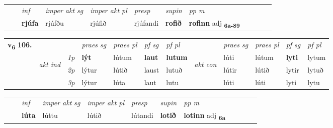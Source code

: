 \begin{tabular}{llllllllllll}
 & & \textit{inf} & \textit{imper akt sg} & \textit{imper akt pl}   & \textit{presp} & \textit{supin}  & \textit{pp m}     \\*
  & & \textbf{rjúfa} & rjúfðu  & rjúfið   & rjúfandi &  \textbf{rofið}  & \textbf{rofinn} adj \textbf{\textsubscript{6a-89}} \\*
\cmidrule{1-12}
\end{tabular}



\begin{tabular}{llllllllllll} \toprule
\multirow{4}{*}{{{\textbf{v{\textsubscript{6}}} \Large{\textbf{106.}}}}}  & &   &  \textit{praes sg}  & \textit{praes pl}  &\textit{ pf sg} & \textit{pf pl} &  &  \textit{praes sg}  & \textit{praes pl}  & \textit{pf sg} & \textit{pf pl } \\*
	\cmidrule{4-7} \cmidrule{9-12}
 & \multirow{3}{*}{\begin{turn}{90}\textit{akt ind}\end{turn}} & {\textit{1p}} & \textbf{lýt} & lútum    & \textbf{laut} & \textbf{lutum} & \multirow{3}{*}{\begin{turn}{90}\textit{akt con}\end{turn}} &lúti & lútum & \textbf{lyti} & lytum\\*
& &  {\textit{2p}} &  lýtur  & lútið   & laust & lutuð & & lútir & lútið & lytir & lytuð \\*
& &  {\textit{3p}} & lýtur & lúta   & laut & lutu & & lúti & lúti& lyti & lytu  \\*
\cmidrule{4-7} \cmidrule{9-12}
\end{tabular}


\begin{tabular}{llllllllllll}
 & & \textit{inf} & \textit{imper akt sg} & \textit{imper akt pl}   & \textit{presp} & \textit{supin}  & \textit{pp m}     \\*
  & & \textbf{lúta} & lúttu  & lútið   & lútandi &  \textbf{lotið}  & \textbf{lotinn} adj \textbf{\textsubscript{6a}} \\*
\cmidrule{1-12}
\end{tabular}



